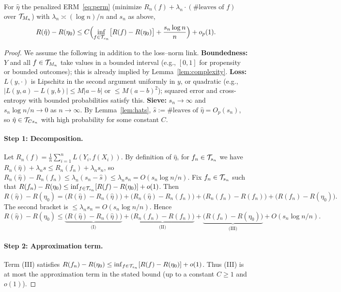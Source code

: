 \documentclass[12pt]{article}
\begin{document}
\begin{lemma}
\label{lem:oracle}
For $\hat\eta$ the penalized ERM~\eqref{eq:perm} (minimize $R_n(f) + \lambda_n \cdot (\#\text{leaves of } f)$ over $\mathcal{T}_{M_n}$) with $\lambda_n \asymp (\log n)/n$ and $s_n$ as above,
\[
R(\hat\eta) - R(\eta_0) \le C \Bigl( \inf_{f \in \mathcal{T}_{s_n}} \bigl[ R(f) - R(\eta_0) \bigr] + \frac{s_n \log n}{n} \Bigr) + o_p(1).
\]
\end{lemma}
\begin{proof}
We assume the following in addition to the loss--norm link. \textbf{Boundedness:} $Y$ and all $f \in \mathcal{T}_{M_n}$ take values in a bounded interval (e.g., $[0,1]$ for propensity or bounded outcomes); this is already implied by Lemma~\ref{lem:complexity}. \textbf{Loss:} $L(y,\cdot)$ is Lipschitz in the second argument uniformly in $y$, or quadratic (e.g., $|L(y,a)-L(y,b)| \le M|a-b|$ or $\le M(a-b)^2$); squared error and cross-entropy with bounded probabilities satisfy this. \textbf{Sieve:} $s_n \to \infty$ and $s_n \log n / n \to 0$ as $n \to \infty$. By Lemma~\ref{lem:hats}, $\hat{s} := \#\text{leaves of }\hat\eta = O_p(s_n)$, so $\hat\eta \in \mathcal{T}_{C s_n}$ with high probability for some constant $C$.

\paragraph{Step 1: Decomposition.}
Let $R_n(f) = \frac{1}{n}\sum_{i=1}^n L(Y_i, f(X_i))$. By definition of $\hat\eta$, for $f_n \in \mathcal{T}_{s_n}$ we have $R_n(\hat\eta) + \lambda_n \hat{s} \le R_n(f_n) + \lambda_n s_n$, so $R_n(\hat\eta) - R_n(f_n) \le \lambda_n(s_n - \hat{s}) \le \lambda_n s_n = O(s_n \log n / n)$. Fix $f_n \in \mathcal{T}_{s_n}$ such that $R(f_n) - R(\eta_0) \le \inf_{f \in \mathcal{T}_{s_n}}[R(f)-R(\eta_0)] + o(1)$. Then
\[
R(\hat\eta) - R(\eta_0) = \bigl(R(\hat\eta) - R_n(\hat\eta)\bigr) + \bigl(R_n(\hat\eta) - R_n(f_n)\bigr) + \bigl(R_n(f_n) - R(f_n)\bigr) + \bigl(R(f_n) - R(\eta_0)\bigr).
\]
The second bracket is $\le \lambda_n s_n = O(s_n \log n / n)$. Hence
\[
R(\hat\eta) - R(\eta_0) \le \underbrace{\bigl(R(\hat\eta) - R_n(\hat\eta)\bigr)}_{\text{(I)}} + \underbrace{\bigl(R_n(f_n) - R(f_n)\bigr)}_{\text{(II)}} + \underbrace{\bigl(R(f_n) - R(\eta_0)\bigr)}_{\text{(III)}} + O(s_n \log n / n).
\]

\paragraph{Step 2: Approximation term.}
Term (III) satisfies $R(f_n) - R(\eta_0) \le \inf_{f \in \mathcal{T}_{s_n}}[R(f)-R(\eta_0)] + o(1)$. Thus (III) is at most the approximation term in the stated bound (up to a constant $C \ge 1$ and $o(1)$).


\end{proof}
\end{document}
